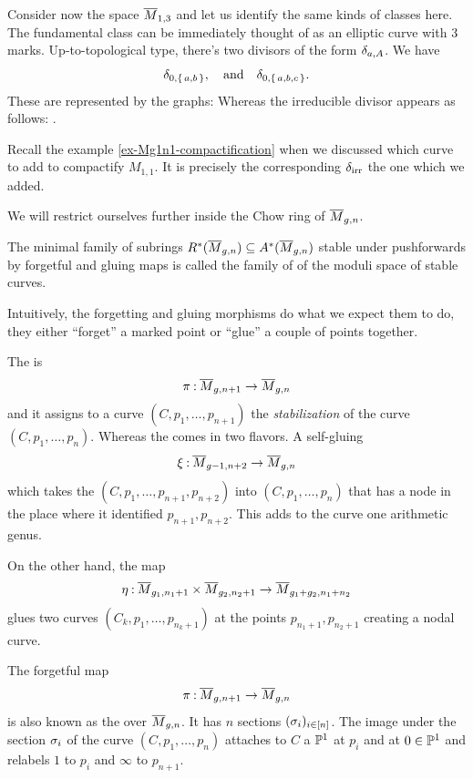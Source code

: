 \documentclass[12pt]{memoir}
\begin{document}
\begin{Ex}
    Consider now the space $\overline M_{1,3}$ and let us identify the same kinds of classes here. The fundamental class can be immediately thought of as an elliptic curve with 3 marks. Up-to-topological type, there's two divisors of the form $\delta_{a,A}$. We have 
    $$\delta_{0,\{\,a,b\,\}},\quad\text{and}\quad\delta_{0,\{\,a,b,c\,\}}.$$ 
    These are represented by the graphs:
    Whereas the irreducible divisor appears as follows: .
\end{Ex}

\begin{Rmk}
    Recall the example \ref{ex-Mg1n1-compactification} when we discussed which curve to add to compactify $M_{1,1}$. It is precisely the corresponding $\delta_{\text{irr}}$ the one which we added.
\end{Rmk}

We will restrict ourselves further inside the Chow ring of $\overline M_{g,n}$. 

\begin{Def}
The minimal family of subrings $R^\ast(\overline M_{g,n})\subseteq A^\ast(\overline M_{g,n})$ stable under pushforwards by forgetful and gluing maps is called the family of  of the moduli space of stable curves.
\end{Def}

Intuitively, the forgetting and gluing morphisms do what we expect them to do, they either ``forget'' a marked point or ``glue'' a couple of points together.  

\begin{Def}
    The  is 
    $$\pi\mathbin{:}\overline M_{g,n+1}\to\overline M_{g,n}$$ 
    and it assigns to a curve $(C,p_1,\dots,p_{n+1})$ the \emph{stabilization} of the curve $(C,p_1,\dots,p_n)$. Whereas the  comes in two flavors. A self-gluing 
    $$\xi\mathbin{:}\overline M_{g-1,n+2}\to\overline M_{g,n}$$
    which takes the $(C,p_1,\dots,p_{n+1},p_{n+2})$ into $(C,p_1,\dots,p_n)$ that has a node in the place where it identified $p_{n+1},p_{n+2}$. This adds to the curve one arithmetic genus.\par
    On the other hand, the map 
    $$\eta\mathbin{:}\overline M_{g_1,n_1+1}\times\overline M_{g_2,n_2+1}\to\overline M_{g_1+g_2,n_1+n_2}$$
    glues two curves $(C_k,p_1,\dots,p_{n_k+1})$ at the points $p_{n_1+1},p_{n_2+1}$ creating a nodal curve.
\end{Def}

\begin{Rmk}
    The forgetful map 
    $$\pi\mathbin{:}\overline M_{g,n+1}\to\overline M_{g,n}$$ 
    is also known as the  over $\overline M_{g,n}$. It has $n$ sections $(\sigma_i)_{i\in \left\lbrack n\right\rbrack}$. The image under the section $\sigma_i$ of the curve $(C,p_1,\dots, p_n)$ attaches to $C$ a $\mathbb{P}^1$ at $p_i$ and at $0\in\mathbb{P}^1$ and relabels $1$ to $p_i$ and $\infty$ to $p_{n+1}$.
\end{Rmk}
\end{document}
